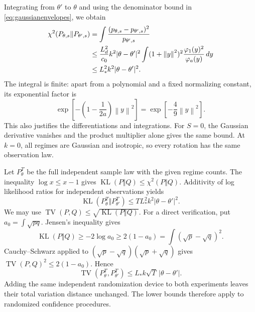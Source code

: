 \documentclass[11pt,a4paper]{article}
\numberwithin{equation}{section}
\newcommand{\norm}[1]{\left\lVert #1\right\rVert}
\DeclareMathOperator{\TV}{TV}
\DeclareMathOperator{\KL}{KL}
\begin{document}
Integrating from \(\theta'\) to \(\theta\) and using the denominator
bound in \eqref{eq:gaussianenvelopes}, we obtain
\begin{align}
 \chi^2(P_{\theta,s}\Vert P_{\theta',s})
 &=\int\frac{(p_{\theta,s}-p_{\theta',s})^2}{p_{\theta',s}}\notag\\
 &\le\frac{L_d^2}{c_0}k^2|\theta-\theta'|^2
   \int(1+\norm y^2)^2\frac{\varphi_1(y)^2}{\varphi_a(y)}\,dy\notag\\
 &\le L_*^2k^2|\theta-\theta'|^2.\label{eq:chisquare}
\end{align}
The integral is finite: apart from a polynomial and a fixed normalizing
constant, its exponential factor is
\[
 \exp\left[-\left(1-\frac1{2a}\right)\norm y^2\right]
 =\exp\left[-\frac49\norm y^2\right].
\]
This also justifies the differentiations and integrations.
For \(S=0\), the Gaussian derivative vanishes and the product multiplier
alone gives the same bound. At \(k=0\), all regimes are Gaussian and
isotropic, so every rotation has the same observation law.

Let \(P_\theta^T\) be the full independent sample law with the given
regime counts. The inequality \(\log x\le x-1\) gives
\(\KL(P\Vert Q)\le\chi^2(P\Vert Q)\).
Additivity of log likelihood ratios for independent observations yields
\begin{equation}\label{eq:productKL}
 \KL(P_\theta^T\Vert P_{\theta'}^T)
 \le TL_*^2k^2|\theta-\theta'|^2.
\end{equation}
We may use \(\TV(P,Q)\le\sqrt{\KL(P\Vert Q)}\).
For a direct verification, put \(a_0=\int\sqrt{pq}\).
Jensen's inequality gives
\[
 \KL(P\Vert Q)\ge-2\log a_0
 \ge2(1-a_0)=\int(\sqrt p-\sqrt q)^2.
\]
Cauchy--Schwarz applied to
\((\sqrt p-\sqrt q)(\sqrt p+\sqrt q)\) gives
\(\TV(P,Q)^2\le2(1-a_0)\). Hence
\begin{equation}\label{eq:TV}
 \TV(P_\theta^T,P_{\theta'}^T)
 \le L_*k\sqrt T\,|\theta-\theta'|.
\end{equation}
Adding the same independent randomization device to both experiments
leaves their total variation distance unchanged. The lower bounds
therefore apply to randomized confidence procedures.
\end{document}
